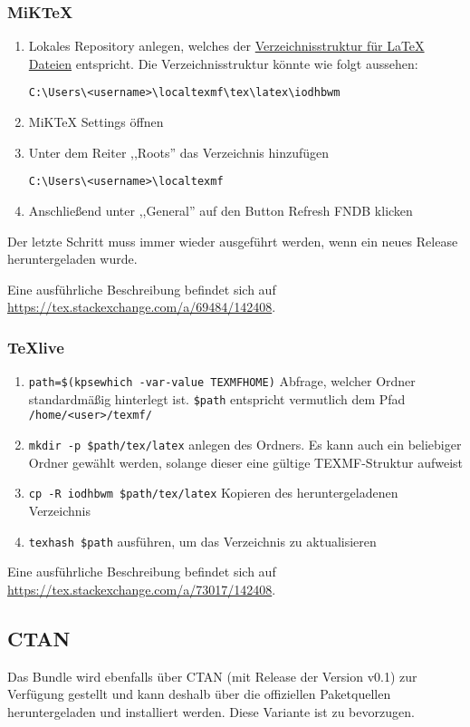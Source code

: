 \documentclass[babel=ngerman,highlight=false]{skdoc}
\begin{document}
            \subsubsection{MiKTeX}
                \begin{enumerate}
                    \item Lokales Repository anlegen, welches der \href{http://tug.ctan.org/tds/tds.html}{Verzeichnisstruktur für \LaTeX{} Dateien} entspricht. Die Verzeichnisstruktur könnte wie folgt aussehen:\par \verb|C:\Users\<username>\localtexmf\tex\latex\iodhbwm|
                    \item MiKTeX Settings öffnen
                    \item Unter dem Reiter ,,Roots'' das Verzeichnis hinzufügen\par \verb|C:\Users\<username>\localtexmf|
                    \item Anschließend unter ,,General'' auf den Button Refresh FNDB klicken
                \end{enumerate}

                Der letzte Schritt muss immer wieder ausgeführt werden, wenn ein neues Release heruntergeladen wurde.

                Eine ausführliche Beschreibung befindet sich auf \url{https://tex.stackexchange.com/a/69484/142408}.

            \subsubsection{TeXlive}

                \begin{enumerate}
                    \item \verb|path=$(kpsewhich -var-value TEXMFHOME)| Abfrage, welcher Ordner standardmäßig hinterlegt ist. \verb|$path| entspricht vermutlich dem Pfad\\ \verb|/home/<user>/texmf/|
                    \item \verb|mkdir -p $path/tex/latex| anlegen des Ordners. Es kann auch ein beliebiger Ordner gewählt werden, solange dieser eine gültige TEXMF-Struktur aufweist
                    \item \verb|cp -R iodhbwm $path/tex/latex| Kopieren des heruntergeladenen Verzeichnis
                    \item \verb|texhash $path| ausführen, um das Verzeichnis zu aktualisieren
                \end{enumerate}

                Eine ausführliche Beschreibung befindet sich auf \url{https://tex.stackexchange.com/a/73017/142408}.

        \subsection{CTAN}
            Das Bundle wird ebenfalls über CTAN (mit Release der Version v0.1) zur Verfügung gestellt und kann deshalb über die offiziellen Paketquellen heruntergeladen und installiert werden. Diese Variante ist zu bevorzugen.

    \PrintChanges

    \PrintIndex
\end{document}
